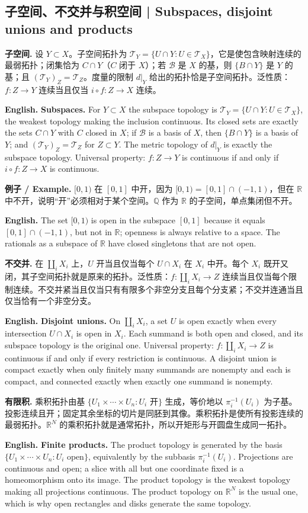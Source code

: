 \documentclass[UTF8,11pt,a4paper]{ctexart}
\newcommand{\EN}[1]{\par\noindent\textbf{English.} #1\par}
\newcommand{\EX}[2]{\par\noindent\textbf{例子 / Example.} #1\par\EN{#2}}
\begin{document}
\subsection{子空间、不交并与积空间 | Subspaces, disjoint unions and products}
\noindent\textbf{子空间.} 设 $Y\subset X$。子空间拓扑为 $\mathcal T_Y=\{U\cap Y:U\in\mathcal T_X\}$，它是使包含映射连续的最弱拓扑；闭集恰为 $C\cap Y$（$C$ 闭于 $X$）；若 $\mathcal B$ 是 $X$ 的基，则 $\{B\cap Y\}$ 是 $Y$ 的基；且 $(\mathcal T_Y)_Z=\mathcal T_Z$。度量的限制 $d|_Y$ 给出的拓扑恰是子空间拓扑。泛性质：$f:Z\to Y$ 连续当且仅当 $i\circ f:Z\to X$ 连续。
\EN{\textbf{Subspaces.} For $Y\subset X$ the subspace topology is $\mathcal T_Y=\{U\cap Y:U\in\mathcal T_X\}$, the weakest topology making the inclusion continuous. Its closed sets are exactly the sets $C\cap Y$ with $C$ closed in $X$; if $\mathcal B$ is a basis of $X$, then $\{B\cap Y\}$ is a basis of $Y$; and $(\mathcal T_Y)_Z=\mathcal T_Z$ for $Z\subset Y$. The metric topology of $d|_Y$ is exactly the subspace topology. Universal property: $f:Z\to Y$ is continuous if and only if $i\circ f:Z\to X$ is continuous.}

\EX{$[0,1)$ 在 $[0,1]$ 中开，因为 $[0,1)=[0,1]\cap(-1,1)$，但在 $\mathbb R$ 中不开，说明“开”必须相对于某个空间。$\mathbb Q$ 作为 $\mathbb R$ 的子空间，单点集闭但不开。}{The set $[0,1)$ is open in the subspace $[0,1]$ because it equals $[0,1]\cap(-1,1)$, but not in $\mathbb R$; openness is always relative to a space. The rationals as a subspace of $\mathbb R$ have closed singletons that are not open.}

\noindent\textbf{不交并.} 在 $\coprod_iX_i$ 上，$U$ 开当且仅当每个 $U\cap X_i$ 在 $X_i$ 中开。每个 $X_i$ 既开又闭，其子空间拓扑就是原来的拓扑。泛性质：$f:\coprod_iX_i\to Z$ 连续当且仅当每个限制连续。不交并紧当且仅当只有有限多个非空分支且每个分支紧；不交并连通当且仅当恰有一个非空分支。
\EN{\textbf{Disjoint unions.} On $\coprod_iX_i$, a set $U$ is open exactly when every intersection $U\cap X_i$ is open in $X_i$. Each summand is both open and closed, and its subspace topology is the original one. Universal property: $f:\coprod_iX_i\to Z$ is continuous if and only if every restriction is continuous. A disjoint union is compact exactly when only finitely many summands are nonempty and each is compact, and connected exactly when exactly one summand is nonempty.}

\noindent\textbf{有限积.} 乘积拓扑由基 $\{U_1\times\cdots\times U_n:U_i\text{ 开}\}$ 生成，等价地以 $\pi_i^{-1}(U_i)$ 为子基。投影连续且开；固定其余坐标的切片是同胚到其像。乘积拓扑是使所有投影连续的最弱拓扑。$\mathbb R^N$ 的乘积拓扑就是通常拓扑，所以开矩形与开圆盘生成同一拓扑。
\EN{\textbf{Finite products.} The product topology is generated by the basis $\{U_1\times\cdots\times U_n:U_i\text{ open}\}$, equivalently by the subbasis $\pi_i^{-1}(U_i)$. Projections are continuous and open; a slice with all but one coordinate fixed is a homeomorphism onto its image. The product topology is the weakest topology making all projections continuous. The product topology on $\mathbb R^N$ is the usual one, which is why open rectangles and disks generate the same topology.}
\end{document}
